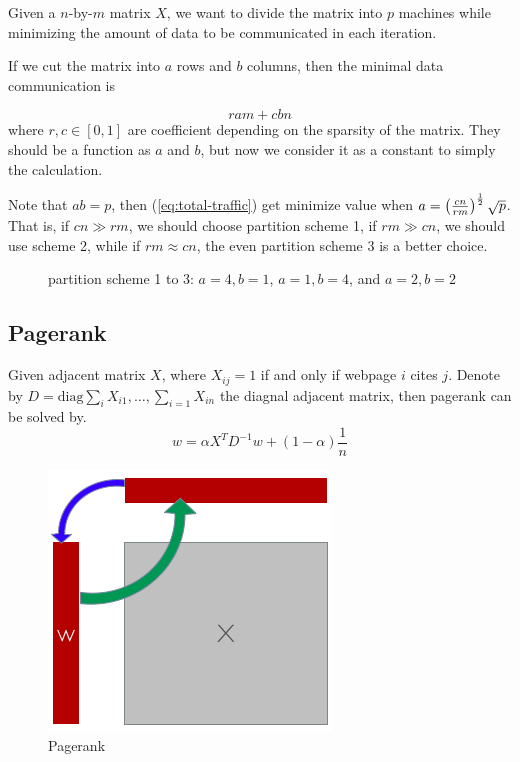 \documentclass{acm_proc_article-sp}
\begin{document}
Given a $n$-by-$m$ matrix $X$, we want to divide the matrix into $p$ machines
while minimizing the amount of data to be communicated in each iteration.

If we cut the matrix into $a$ rows and $b$ columns, then the minimal data
communication is

\begin{equation}
  r  am +  c bn
  \label{eq:total-traffic}
\end{equation}
where $r,c \in [0,1]$ are coefficient depending on the sparsity of the
matrix. They should be a function as $a$ and $b$, but now we consider it as a
constant to simply the calculation.

Note that $ab=p$, then (\ref{eq:total-traffic}) get minimize value when
$a = \left( \frac{cn}{rm} \right)^{\frac{1}{2}}\sqrt{p}$. That is, if $cn \gg rm$, we
should choose partition scheme 1, if $rm \gg cn$, we should use scheme 2, while
if $rm \approx cn$, the even partition scheme 3 is a better choice.

\begin{figure}[th!]
  \centering
{}
  \caption{partition scheme 1 to 3: $a=4,b=1$, $a=1,b=4$, and $a=2,b=2$}
\end{figure}

\subsection{Pagerank}
\label{sec:pagerank}

Given adjacent matrix $X$, where $X_{ij} = 1 $ if and only if webpage $i$ cites
$j$. Denote by $D=\textrm{diag}{\sum_i X_{i1}, \ldots, \sum_{i=1} X_{in}}$ the diagnal
adjacent matrix, then pagerank can be solved by.
\begin{equation}
  w = \alpha X^T D^{-1} w + (1-\alpha)\frac{1}{n}
\end{equation}

\begin{figure}[th!]
  \centering
  \includegraphics[width=.25\textwidth]{fig/pr}
  \caption{Pagerank}
  \label{fig:pr}
\end{figure}
\end{document}
